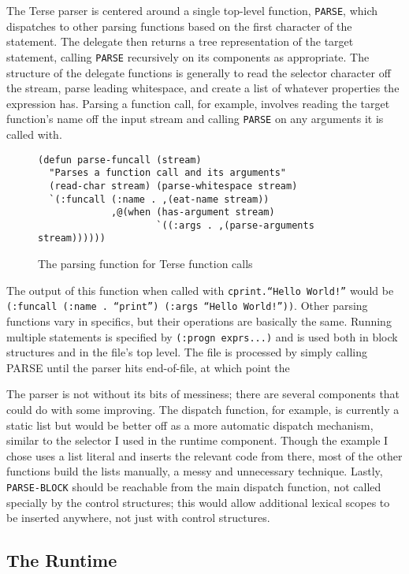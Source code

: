 \documentclass[12pt]{article}
\newcommand{\code}[1]{\texttt{#1}}
\begin{document}
The Terse parser is centered around a single top-level function,
\code{PARSE}, which dispatches to other parsing functions based on the
first character of the statement. The delegate then returns a tree
representation of the target statement, calling \code{PARSE}
recursively on its components as appropriate. The structure of the
delegate functions is generally to read the selector character off the
stream, parse leading whitespace, and create a list of whatever
properties the expression has. Parsing a function call, for example,
involves reading the target function's name off the input stream and
calling \code{PARSE} on any arguments it is called with.

\begin{figure}
\begin{verbatim}
(defun parse-funcall (stream)
  "Parses a function call and its arguments"
  (read-char stream) (parse-whitespace stream)
  `(:funcall (:name . ,(eat-name stream))
             ,@(when (has-argument stream)
                     `((:args . ,(parse-arguments stream))))))
\end{verbatim}
\caption{The parsing function for Terse function calls}
\end{figure}
The output of this function when called with \code{cprint.``Hello
  World!''} would be \code{(:funcall (:name . “print”) (:args ``Hello
  World!''))}. Other parsing functions vary in specifics, but their
operations are basically the same. Running multiple statements is
specified by \code{(:progn exprs...)} and is used both in block
structures and in the file's top level. The file is processed by
simply calling PARSE until the parser hits end-of-file, at which point
the

The parser is not without its bits of messiness; there are several
components that could do with some improving. The dispatch function,
for example, is currently a static list but would be better off as a
more automatic dispatch mechanism, similar to the selector I used in
the runtime component. Though the example I chose uses a list literal
and inserts the relevant code from there, most of the other functions
build the lists manually, a messy and unnecessary technique. Lastly,
\code{PARSE-BLOCK} should be reachable from the main dispatch
function, not called specially by the control structures; this would
allow additional lexical scopes to be inserted anywhere, not just with
control structures.

\subsection{The Runtime}
\end{document}
